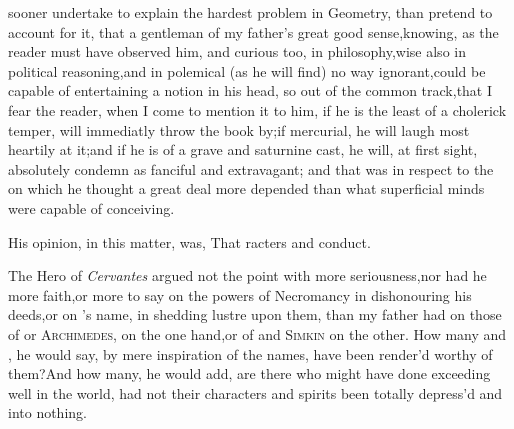 \documentclass{article}
\begin{document}
 sooner undertake to explain
the hardest problem in Geometry,\break
than pretend to account for it, that a\break
gentleman of my father’s great good
sense,\tsh knowing, as the reader must have observed him,
and curious too, in philosophy,\tsk wise also in political
reasoning,\tsk and in polemical (as he will find) no way
ignorant,\tsk could be capable of entertaining a notion in his
head, so out of the common track,\tsk that I fear the reader,
when I come to mention it to him, if he is the least of a cholerick
temper, will immediatly throw the book by;\break if mercurial, he will laugh most
heartily at it;\tsk and if he is of a grave and sa\-turnine cast, he will, at first
sight, abso\-lutely condemn as fanciful and extrava\-gant; and that was in respect
to the\break{} on which he thought a
great deal more depended than what superficial minds were capable of
conceiving.

His opinion, in this matter, was, That
racters and conduct.

The Hero of \textit{Cervantes} argued not the point with more
seriousness,\tsk nor had\break 
he more faith,\tsh or more to say on the\break
powers of Necromancy in dishonouring his
deeds,\tsk or on ’s name, in
shedding lustre upon them, than my father had on those of
 or \textsc{Archimedes}, on the
one hand,\tsk or of  and \textsc{Simkin}
on the other. How many  and
, he would say, by mere inspiration of the
names, have been render’d worthy of them?\break And how many, he would
add, are there who might have done exceeding well in the world,
had not their characters and 
spirits been totally depress’d and  into
nothing.
\end{document}
